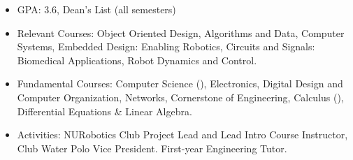 \documentclass[10pt,a4paper,ragged2e,withhyper]{altacv}
\newcommand{\rom}[1]{\uppercase\expandafter{\romannumeral #1\relax}}
\begin{document}
\vspace{-2em}
\begin{paracol}{2}

    \begin{itemize}
        \item GPA: 3.6, Dean's List (all semesters)
        \item Relevant Courses: Object Oriented Design, Algorithms and Data, Computer Systems, Embedded Design: Enabling Robotics, Circuits and Signals: Biomedical Applications, Robot Dynamics and Control.
        \item Fundamental Courses: Computer Science (\rom{2}), Electronics, Digital Design and Computer Organization, Networks, Cornerstone of Engineering, Calculus (\rom{3}), Differential Equations \& Linear Algebra.
        \item Activities: NURobotics Club Project Lead and Lead Intro Course Instructor, Club Water Polo Vice President. First-year Engineering Tutor.
    \end{itemize}



\end{paracol}
\end{document}
